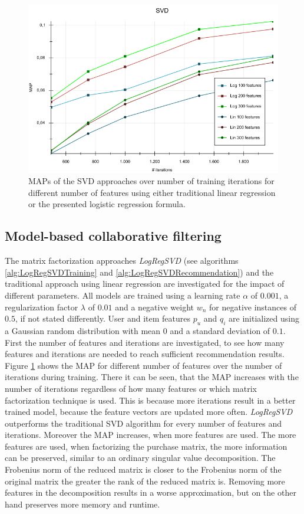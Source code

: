 \documentclass[10pt]{reportMaster}
\begin{document}
\begin{figure}
	\centering
	\includegraphics[width=1\textwidth]{figures/experiments/SVDIterations}
	\caption{MAPs of the SVD approaches over number of training iterations for different number of features using either traditional linear regression or the presented logistic regression formula.}
	\label{fig:SVDIterations}
\end{figure}

\subsection{Model-based collaborative filtering}
The matrix factorization approaches \textit{LogRegSVD} (see algorithms \ref{alg:LogRegSVDTraining} and \ref{alg:LogRegSVDRecommendation}) and the traditional approach using linear regression are investigated for the impact of different parameters.
All models are trained using a learning rate $\alpha$ of $0.001$, a regularization factor $\lambda$ of $0.01$ and a negative weight $w_n$ for negative instances of $0.5$, if not stated differently.
User and item features $p_u$ and $q_i$ are initialized using a Gaussian random distribution with mean 0 and a standard deviation of $0.1$.
First the number of features and iterations are investigated, to see how many features and iterations are needed to reach sufficient recommendation results.
Figure \ref{fig:SVDIterations} shows the MAP for different number of features over the number of iterations during training.
There it can be seen, that the MAP increases with the number of iterations regardless of how many features or which matrix factorization technique is used.
This is because more iterations result in a better trained model, because the feature vectors are updated more often.
\textit{LogRegSVD} outperforms the traditional SVD algorithm for every number of features and iterations.
Moreover the MAP increases, when more features are used.
The more features are used, when factorizing the purchase matrix, the more information can be preserved, similar to an ordinary singular value decomposition.
The Frobenius norm of the reduced matrix is closer to the Frobenius norm of the original matrix the greater the rank of the reduced matrix is.
Removing more features in the decomposition results in a worse approximation, but on the other hand preserves more memory and runtime.
\end{document}
